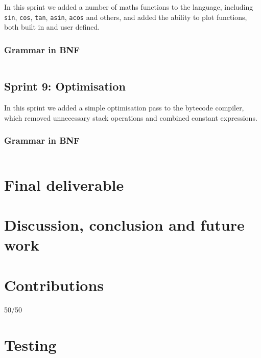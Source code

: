 \documentclass[a4paper, oneside, 11pt]{report}
\begin{document}
In this sprint we added a number of maths functions to the language, including \texttt{sin}, \texttt{cos}, \texttt{tan},
\texttt{asin}, \texttt{acos} and others, and added the ability to plot functions, both built in and user defined.

\subsection{Grammar in BNF}\label{subsec:grammar-in-bnf9}

\begin{verbatim}
\end{verbatim}

\section{Sprint 9: Optimisation}\label{sec:optimisation1}

In this sprint we added a simple optimisation pass to the bytecode compiler, which removed unnecessary stack operations
and combined constant expressions.

\subsection{Grammar in BNF}\label{subsec:grammar-in-bnf10}

\begin{verbatim}
\end{verbatim}

\chapter{Final deliverable}\label{ch:impl}



\chapter{Discussion, conclusion and future work}\label{ch:discussion-conclusion-and-future-work}





\appendix
\chapter{Contributions}\label{ch:contributions}

50/50

\chapter{Testing}\label{ch:test}
\end{document}
